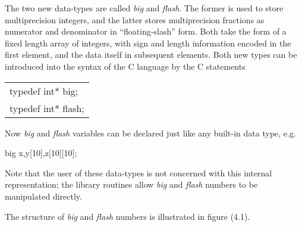       The two new data-types are called {\em big} and {\em flash}.  The  former is 
      used  to  store  multiprecision  integers,   and  the  latter  stores 
      multiprecision fractions as numerator and denominator  in
     ``floating-slash'' form.  Both take the form of a fixed length array of
      integers, 
      with sign and length information encoded in the  first  element,  and 
      the  data  itself  in  subsequent  elements.  Both  new  types can be 
      introduced into the syntax of the C language by the C  statements 

      \begin{center}
      \begin{tabular}{l}
                            typedef int* big;     \\
                            typedef int* flash; 
      \end{tabular}
      \end{center}
      \pagebreak
      Now  {\em big} and {\em flash} variables can be declared just like any 
      built-in data type, e.g.  

      \begin{center}
                             big x,y[10],z[10][10];
      \end{center}

      Note that the user of these data-types is  not  concerned  with  this 
      internal representation; the library routines allow {\em big} and {\em flash} 
      numbers to be manipulated directly.  

      The structure of {\em big} and {\em flash} numbers is illustrated in figure (4.1).

